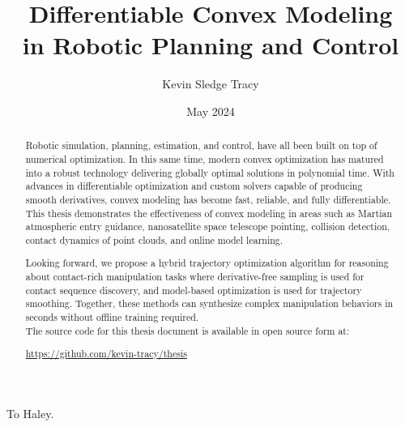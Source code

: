 \documentclass[12pt]{cmuthesis}
\begin{document}
\frontmatter

\pagestyle{empty}

\title{{\bf Differentiable Convex Modeling \\in Robotic Planning and Control}}
\author{Kevin Sledge Tracy}
\date{May 2024}


\support{}
\disclaimer{}


\maketitle

\begin{dedication}
  To Haley.
\end{dedication}

\begin{abstract}
Robotic simulation, planning, estimation, and control, have all been built on top of numerical optimization. In this same time, modern convex optimization has matured into a robust technology delivering globally optimal solutions in polynomial time. With advances in differentiable optimization and custom solvers capable of producing smooth derivatives, convex modeling has become fast, reliable, and fully differentiable. This thesis demonstrates the effectiveness of convex modeling in areas such as Martian atmospheric entry guidance, nanosatellite space telescope pointing, collision detection, contact dynamics of point clouds, and online model learning.

Looking forward, we propose a hybrid trajectory optimization algorithm for reasoning about contact-rich manipulation tasks where derivative-free sampling is used for contact sequence discovery, and model-based optimization is used for trajectory smoothing. Together, these methods can synthesize complex manipulation behaviors in seconds without offline training required. 
 \\

  \noindent
  The source code for this thesis document is available in open source form at:
  \begin{center}
  \url{https://github.com/kevin-tracy/thesis}
  \end{center}
\end{abstract}
\end{document}
